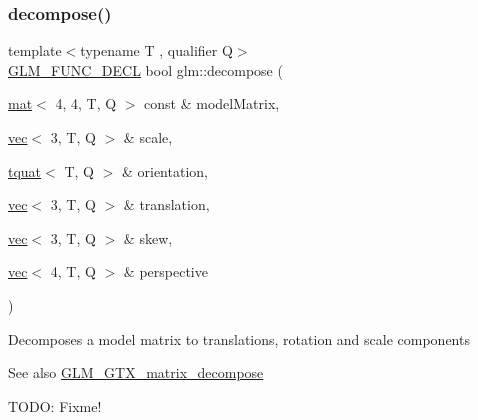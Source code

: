 \subsubsection{\texorpdfstring{decompose()}{decompose()}}
{\footnotesize\ttfamily template$<$typename T , qualifier Q$>$ \\
\hyperlink{setup_8hpp_ab2d052de21a70539923e9bcbf6e83a51}{G\+L\+M\+\_\+\+F\+U\+N\+C\+\_\+\+D\+E\+CL} bool glm\+::decompose (\begin{DoxyParamCaption}\item[{\hyperlink{structglm_1_1mat}{mat}$<$ 4, 4, T, Q $>$ const \&}]{model\+Matrix,  }\item[{\hyperlink{structglm_1_1vec}{vec}$<$ 3, T, Q $>$ \&}]{scale,  }\item[{\hyperlink{structglm_1_1tquat}{tquat}$<$ T, Q $>$ \&}]{orientation,  }\item[{\hyperlink{structglm_1_1vec}{vec}$<$ 3, T, Q $>$ \&}]{translation,  }\item[{\hyperlink{structglm_1_1vec}{vec}$<$ 3, T, Q $>$ \&}]{skew,  }\item[{\hyperlink{structglm_1_1vec}{vec}$<$ 4, T, Q $>$ \&}]{perspective }\end{DoxyParamCaption})}

Decomposes a model matrix to translations, rotation and scale components \begin{DoxySeeAlso}{See also}
\hyperlink{group__gtx__matrix__decompose}{G\+L\+M\+\_\+\+G\+T\+X\+\_\+matrix\+\_\+decompose} 
\end{DoxySeeAlso}
T\+O\+DO\+: Fixme! 